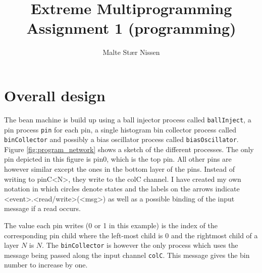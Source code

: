 \documentclass[11pt,a4paper]{article}
\title{Extreme Multiprogramming\\Assignment 1 (programming)}
\author{Malte Stær Nissen}
\begin{document}
\maketitle

\section{Overall design}
The bean machine is build up using a ball injector process called
\texttt{ballInject}, a pin process \texttt{pin} for each pin, a single histogram
bin collector process called \texttt{binCollector} and possibly a bias
oscillator process called \texttt{biasOscillator}. Figure
\ref{fig:program_network} shows a sketch of the different processes. The only
pin depicted in this figure is pin0, which is the top pin. All other pins are
however similar except the ones in the bottom layer of the pins. Instead of
writing to pinC<N>, they write to the colC channel. I have created my own
notation in which circles denote states and the labels on the arrows indicate
<event>.<read/write>(<msg>) as well as a possible binding of the input message
if a read occurs.

The value each pin writes (0
or 1 in this example) is the index of the corresponding pin child where the
left-most child is 0 and the rightmost child of a layer $N$ is $N$. The
\texttt{binCollector} is however the only process which uses the message being passed along
the input channel \texttt{colC}. This message gives the bin number to increase
by one.
\end{document}
